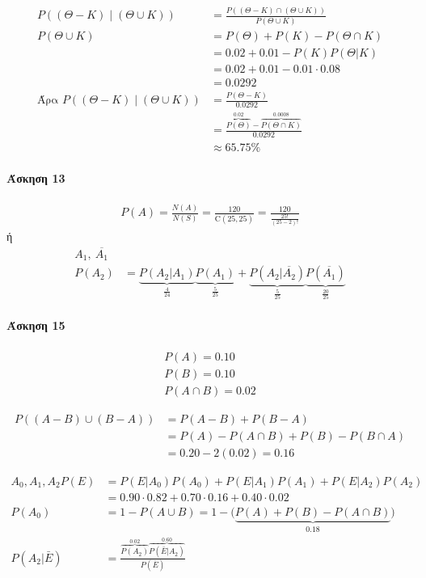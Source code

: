 \documentclass[11pt,a4paper,titlepage,draft]{article}
\begin{document}
\begin{align*}
P \left(  (\Theta - K) \middle| (\Theta \cup K) \right) &=
\frac{P \left(  (\Theta - K) \cap (\Theta \cup K) \right)}{P(\Theta \cup K)}
\\
P(\Theta \cup K) &=
P(\Theta)+P(K)-P(\Theta \cap K) \\
&= 0.02+0.01-P(K)P(\Theta | K) \\
&= 0.02+0.01-0.01 \cdot 0.08 \\
&= 0.0292 \\
\text{Άρα }
P \left(  (\Theta - K) \middle| (\Theta \cup K) \right) &=
\frac{P(\Theta - K)}{0.0292} \\
&=
\frac{\overbrace{P(\Theta)}^{0.02} - \overbrace{P(\Theta \cap K)}^{0.0008}}{0.0292}
\\
&\approx 65.75 \%
\end{align*}

\paragraph{Άσκηση 13}
\begin{gather*}
P(A) = \frac{N(A)}{N(S)} = \frac{120}{\mathrm C(25,25)}
= \frac{120}{\frac{25!}{(25-2)!}}
\end{gather*}
ή
\begin{align*}
A_1,\ \overline{A_1} \\
P(A_2) &= \underbrace{P(A_2|A_1)}_\frac{4}{24}
\underbrace{P(A_1)}_\frac{5}{25}+
\underbrace{P(A_2|\overline{A_2})}_\frac{5}{25}
\underbrace{P(\overline{A_1})}_\frac{20}{25}
\end{align*}

\paragraph{Άσκηση 15}
\begin{align*}
P(A)=0.10\\
P(B)=0.10\\
P(A\cap B)=0.02
\end{align*}

\begin{align*}
P \left(
(A-B) \cup (B-A)
\right) &= P(A-B)+P(B-A) \\ &=
P(A)-P(A \cap B) + P(B) - P (B \cap A)
\\ &=
0.20 - 2 (0.02) = 0.16
\end{align*}

\begin{align*}
A_0,A_1,A_2
P(E) &=
P(E|A_0)P(A_0)+P(E|A_1)P(A_1)+P(E|A_2)P(A_2)
\\ &=
0.90\cdot 0.82 + 0.70 \cdot 0.16 + 0.40 \cdot 0.02 \\
P(A_0) &= 1 - P(A \cup B)
=
1 -
\big(
\underbrace{
P(A)+P(B)-P(A \cap B)
}_{0.18}
\big) \\
P(A_2|\bar{E}) &=
\frac{\overbrace{P(A_2)}^{0.02} \overbrace{P(\bar{E}|A_2)}^{0.60}}{P(\bar{E})}
\end{align*}
\end{document}
